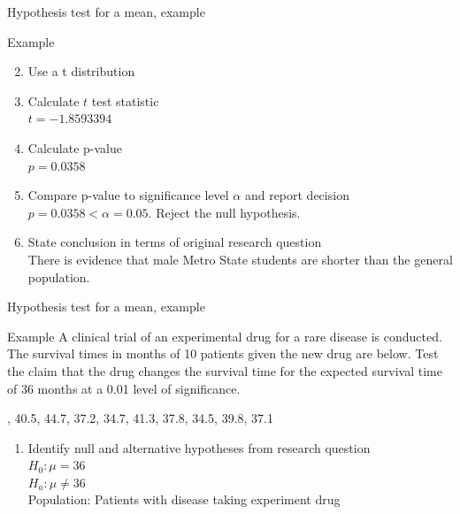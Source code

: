 \documentclass[xcolor=table]{beamer}
\begin{document}
\begin{frame}{Hypothesis test for a mean, example}
\begin{exampleblock}{Example}
\large
\begin{enumerate}
\setcounter{enumi}{1}

\item Use a t distribution
\pause\item Calculate $t$ test statistic\\
\pause$t=-1.8593394$
\pause\item Calculate p-value\\
\pause$p = 0.0358$
\pause\item Compare p-value to significance level $\alpha$ and report decision\\
\pause$p = 0.0358 < \alpha = 0.05$. Reject the null hypothesis.
\pause\item State conclusion in terms of original research question\\
\pause There is evidence that male Metro State students are shorter than the general population.
\end{enumerate}

\end{exampleblock}
\end{frame}

\begin{frame}{Hypothesis test for a mean, example}
\begin{exampleblock}{Example}
\large
A clinical trial of an experimental drug for a rare disease is conducted. The survival times in months of 10 patients given the new drug are below. Test the claim that the drug changes the survival time for the expected survival time of 36 months at a 0.01 level of significance.\\
\medskip
{, 40.5, 44.7, 37.2, 34.7, 41.3, 37.8, 34.5, 39.8, 37.1
\par}
\begin{enumerate}
\pause\item Identify null and alternative hypotheses from research question\\
\pause$H_0: \mu = 36$\\
$H_a: \mu \ne 36$\\
Population: Patients with disease taking experiment drug
\end{enumerate}
\end{exampleblock}
\end{frame}
\end{document}
